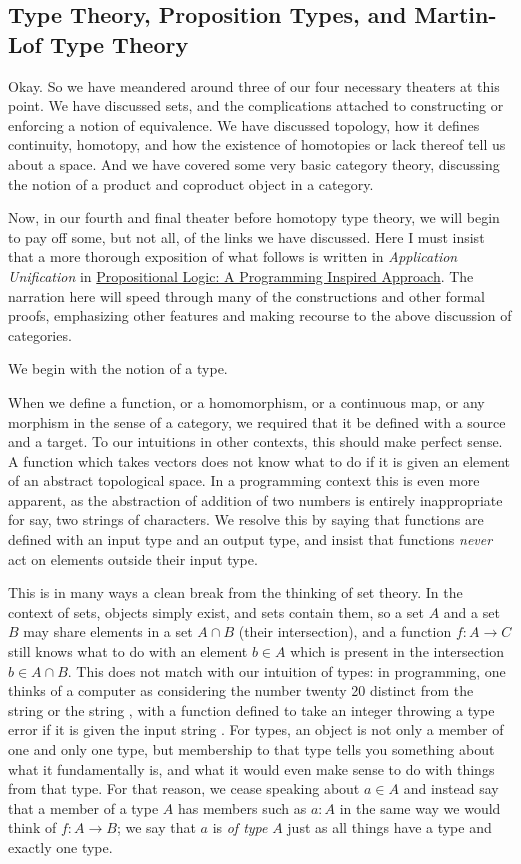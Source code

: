 \documentclass[11pt]{article}
\begin{document}
\subsection{Type Theory, Proposition Types, and Martin-Lof Type Theory}

Okay. So we have meandered around three of our four necessary theaters at this point. We have discussed sets, and the complications attached to constructing or enforcing a notion of equivalence. We have discussed topology, how it defines continuity, homotopy, and how the existence of homotopies or lack thereof tell us about a space. And we have covered some very basic category theory, discussing the notion of a product and coproduct object in a category.

Now, in our fourth and final theater before homotopy type theory, we will begin to pay off some, but not all, of the links we have discussed. Here I must insist that a more thorough exposition of what follows is written in \emph{Application Unification} in \hyperlink{https://clockssugars.blog/appliuni/prelims/proptypes.html}{Propositional Logic: A Programming Inspired Approach}. The narration here will speed through many of the constructions and other formal proofs, emphasizing other features and making recourse to the above discussion of categories.

We begin with the notion of a type.

When we define a function, or a homomorphism, or a continuous map, or any morphism in the sense of a category, we required that it be defined with a source and a target. To our intuitions in other contexts, this should make perfect sense. A function which takes vectors does not know what to do if it is given an element of an abstract topological space. In a programming context this is even more apparent, as the abstraction of addition of two numbers is entirely inappropriate for say, two strings of characters. We resolve this by saying that functions are defined with an input type and an output type, and insist that functions \emph{never} act on elements outside their input type.

This is in many ways a clean break from the thinking of set theory. In the context of sets, objects simply exist, and sets contain them, so a set $A$ and a set $B$ may share elements in a set $A \cap B$ (their intersection), and a function $f \colon A \to C$ still knows what to do with an element $b \in A$ which is present in the intersection $b \in A \cap B$. This does not match with our intuition of types: in programming, one thinks of a computer as considering the number twenty 20 distinct from the string  or the string , with a function defined to take an integer throwing a type error if it is given the input string . For types, an object is not only a member of one and only one type, but membership to that type tells you something about what it fundamentally is, and what it would even make sense to do with things from that type. For that reason, we cease speaking about $a \in A$ and instead say that a member of a type $A$ has members such as $a \colon A$ in the same way we would think of $f \colon A \to B$; we say that $a$ is \emph{of type} $A$ just as all things have a type and exactly one type.
\end{document}
